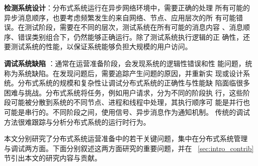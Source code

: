 \textbf{检测系统设计}：分布式系统运行在异步网络环境中，需要正确的处理
所有可能的异步消息顺序，也要考虑频繁发生的来自网络、节点、应用层次的所
有可能错误。在测试阶段，需要在不同的层次，测试系统在所有可能的消息内容
、消息顺序、错误类别组合下，仍然能够正确运行。除了测试系统执行逻辑的正
确性，还要测试系统的性能，以保证系统能够负担大规模的用户访问。

\textbf{调试系统缺陷} ：通常在运营准备阶段，会发现系统的逻辑性错误和性
能问题，统称为系统缺陷。在发现问题后，需要追踪产生问题的原因，并重新实
现或设计系统。分布式系统的规模和复杂性让调试分布式系统的正确性与性能缺
陷面临很多困难与挑战。分布式系统将任务，例如用户请求，分为不同的阶段执
行，这些阶段可能被分散到系统的不同节点、进程和线程中处理，其执行顺序可
能是并行也可能是串行的。不同阶段之间，使用信号、异步消息作为通知机制。
传统的调试方法很难跟踪与分析分布式系统的运行时行为。


本文分别研究了分布式系统运营准备中的若干关键问题，集中在分布式系统管理
与调试两方面。下面分别叙述这两方面研究的重要问题，并在~
\ref{sec:intro_contrib}节引出本文的研究内容与贡献。

% 
% 
% 
% 






